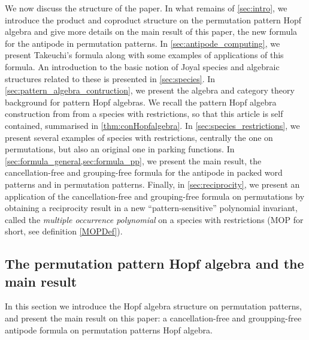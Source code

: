 \documentclass[12pt, reqno]{amsart}
\theoremstyle{definition}
\begin{document}
We now discuss the structure of the paper.
In what remains of \cref{sec:intro}, we introduce the product and coproduct structure on the permutation pattern Hopf algebra and give more details on the main result of this paper, the new formula for the antipode in permutation patterns.
In \cref{sec:antipode_computing}, we present Takeuchi's formula along with some examples of applications of this formula.
An introduction to the basic notion of Joyal species and algebraic structures related to these is presented in \cref{sec:species}. In \cref{sec:pattern_algebra_contruction}, we present the algebra and category theory background for pattern Hopf algebras. We recall the pattern Hopf algebra construction from \cite{Penaguiao2020} from a species with restrictions, so that this article is self contained, summarised in \cref{thm:conHopfalgebra}.
In \cref{sec:species_restrictions}, we present several examples of species with restrictions, centrally the one on permutations, but also an original one in parking functions.
In \cref{sec:formula_general,sec:formula_pp}, we present the main result, the cancellation-free and grouping-free formula for the antipode in packed word patterns and in permutation patterns.
Finally, in \cref{sec:reciprocity}, we present an application of the cancellation-free and grouping-free formula on permutations by obtaining a reciprocity result in a new ``pattern-sensitive'' polynomial invariant, called the \emph{multiple occurrence polynomial} on a species with restrictions (MOP for short, see definition \eqref{MOPDef}).



\subsection{The permutation pattern Hopf algebra and the main result}

In this section we introduce the Hopf algebra structure on permutation patterns, and present the main result on this paper: a cancellation-free and groupping-free antipode formula on permutation patterns Hopf algebra.
\end{document}
